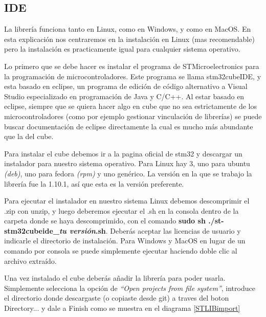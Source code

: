 \documentclass{report}
\begin{document}
\subsection{IDE}


\par
La librería funciona tanto en Linux, como en Windows, y como en MacOS. En esta explicación nos centraremos en la instalación en Linux (mas recomendable) pero la instalación es practicamente igual para cualquier sistema operativo.
\par \vspace{0.3 cm}
Lo primero que se debe hacer es instalar el programa de STMicroelectronics para la programación de microcontroladores. Este programa se llama stm32cubeIDE, y esta basado en eclipse, un programa de edición de código alternativo a Visual Studio especializado en programación de Java y C/C++. Al estar basado en eclipse, siempre que se quiera hacer algo en cube que no sea estrictamente de los microcontroladores (como por ejemplo gestionar vinculación de librerías) se puede buscar documentación de eclipse directamente la cual es mucho más abundante que la del cube. \par
Para instalar el cube debemos ir a la pagina oficial de stm32 \cite{web:STM32:installationCube} y descargar un instalador para nuestro sistema operativo. Para Linux hay 3, uno para ubuntu \textit{(deb)}, uno para fedora \textit{(rpm)} y uno genérico. La versión en la que se trabajo la librería fue la 1.10.1, así que esta es la versión preferente. \par
Para ejecutar el instalador en nuestro sistema Linux debemos descomprimir el .zip con unzip, y luego deberemos ejecutar el .sh en la consola dentro de la carpeta donde se haya descomprimido, con el comando \textbf{sudo sh ./st-stm32cubeide\_\textit{tu versión}.sh}. Deberás aceptar las licencias de usuario y indicarle el directorio de instalación. Para Windows y MacOS en lugar de un comando por consola se puede simplemente ejecutar haciendo doble clic al archivo extraído. 
\par \vspace{0.3 cm}

Una vez instalado el cube deberás añadir la librería para poder usarla. Simplemente selecciona la opción de \textit{``Open projects from file system''}, introduce el directorio donde descargaste (o copiaste desde git) a traves del boton Directory... y dale a Finish como se muestra en el diagrama \ref{STLIBimport} \par \vspace{0.3 cm}
\end{document}
